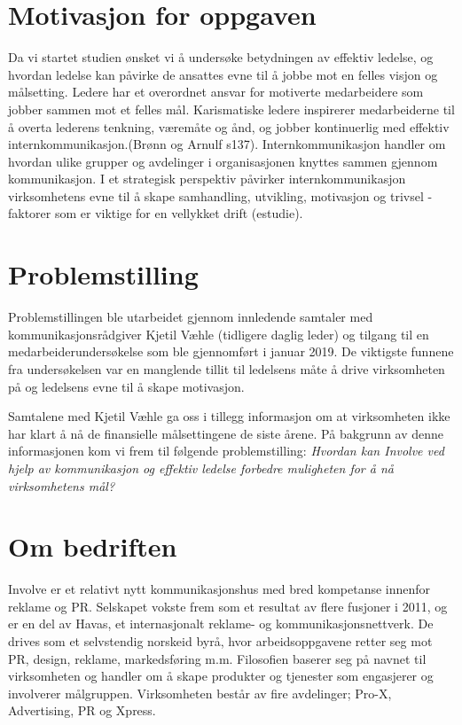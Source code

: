 \section{Motivasjon for oppgaven}
Da vi startet studien ønsket vi å undersøke betydningen av effektiv ledelse, og hvordan ledelse kan påvirke de ansattes evne til å jobbe mot en felles visjon og målsetting. Ledere har et overordnet ansvar for motiverte medarbeidere som jobber sammen mot et felles mål. Karismatiske ledere inspirerer medarbeiderne til å overta lederens tenkning, væremåte og ånd, og jobber kontinuerlig med effektiv internkommunikasjon.(Brønn og Arnulf s137). Internkommunikasjon handler om hvordan ulike grupper og avdelinger i organisasjonen knyttes sammen gjennom kommunikasjon. I et strategisk perspektiv påvirker internkommunikasjon virksomhetens evne til å skape samhandling, utvikling, motivasjon og trivsel - faktorer som er viktige for en vellykket drift (estudie).

\section{Problemstilling}
Problemstillingen ble utarbeidet gjennom innledende samtaler med kommunikasjonsrådgiver Kjetil Væhle (tidligere daglig leder) og tilgang til en medarbeiderundersøkelse som ble gjennomført i januar 2019. De viktigste funnene fra undersøkelsen var en manglende tillit til ledelsens måte å drive virksomheten på og ledelsens evne til å skape motivasjon. 

\indent \newline
Samtalene med Kjetil Væhle ga oss i tillegg informasjon om at virksomheten ikke har klart å nå de finansielle målsettingene de siste årene. På bakgrunn av denne informasjonen kom vi frem til følgende problemstilling:
\textit{Hvordan kan Involve ved hjelp av kommunikasjon og effektiv ledelse forbedre muligheten for å nå virksomhetens mål?}

\section{Om bedriften}
Involve er et relativt nytt kommunikasjonshus med bred kompetanse innenfor reklame og PR. Selskapet vokste frem som et resultat av flere fusjoner i 2011, og er en del av Havas, et internasjonalt reklame- og kommunikasjonsnettverk. De drives som et selvstendig norskeid byrå, hvor arbeidsoppgavene retter seg mot PR, design, reklame, markedsføring m.m. Filosofien baserer seg på navnet til virksomheten og handler om å skape produkter og tjenester som engasjerer og involverer målgruppen. Virksomheten består av fire avdelinger; Pro-X, Advertising, PR og Xpress.

